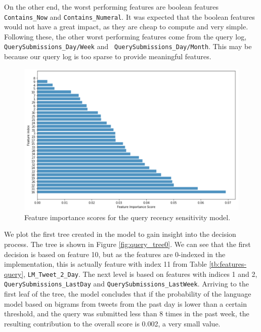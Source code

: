 On the other end, the worst performing features are boolean features \texttt{Contains\_Now} and \texttt{Contains\_Numeral}. It was expected that the boolean features would not have a great impact, as they are cheap to compute and very simple. Following these, the other worst performing features come from the query log, \texttt{QuerySubmissions\_Day/Week} and \texttt{ QuerySubmissions\_Day/Month}. This may be because our query log is too sparse to provide meaningful features.

\begin{figure}
  \centering
  \includegraphics[width=\linewidth]{img/query_f_importance.png}
  \caption{Feature importance scores for the query recency sensitivity model.}
  \label{fig:fscores-queries}
\end{figure}

We plot the first tree created in the model to gain insight into the decision process. The tree is shown in Figure \ref{fig:query_tree0}. We can see that the first decision is based on feature 10, but as the features are 0-indexed in the implementation, this is actually feature with index 11 from Table \ref{tb:features-query}, \texttt{LM\_Tweet\_2\_Day}. The next level is based on features with indices 1 and 2, \texttt{QuerySubmissions\_LastDay} and \texttt{QuerySubmissions\_LastWeek}. Arriving to the first leaf of the tree, the model concludes that if the probability of the language model based on bigrams from tweets from the past day is lower than a certain threshold, and the query was submitted less than 8 times in the past week, the resulting contribution to the overall score is 0.002, a very small value.

